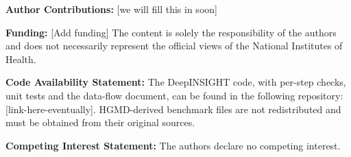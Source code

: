 \documentclass[11pt]{article}
\begin{document}
{\small
\noindent\textbf{Author Contributions:} [we will fill this in soon]

\noindent\textbf{Funding:} [Add funding] The content is solely the responsibility of the authors and
does not necessarily represent the official views of the National Institutes of Health.

\noindent\textbf{Code Availability Statement:} The DeepINSIGHT code, with per-step checks, unit tests and
the data-flow document, can be found in the following repository: [link-here-eventually]. HGMD-derived benchmark files are not redistributed and
must be obtained from their original sources.

\noindent\textbf{Competing Interest Statement:} The authors declare no competing interest.\par}
\end{document}
